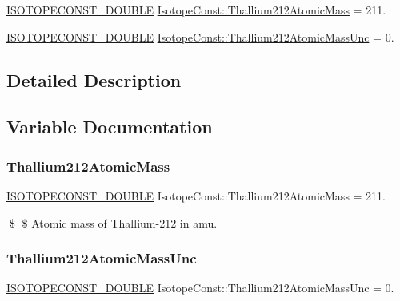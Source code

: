 \begin{DoxyCompactItemize}
\item 
\mbox{\hyperlink{group___isotope_const-_macros_ga8f45a7272ce02c0b4c65c44636ed719a}{I\+S\+O\+T\+O\+P\+E\+C\+O\+N\+S\+T\+\_\+\+D\+O\+U\+B\+LE}} \mbox{\hyperlink{group___isotope_const-_thallium-_tl212_gaec1659a9faf24b40a7d51c0818119d07}{Isotope\+Const\+::\+Thallium212\+Atomic\+Mass}} = 211.
\item 
\mbox{\hyperlink{group___isotope_const-_macros_ga8f45a7272ce02c0b4c65c44636ed719a}{I\+S\+O\+T\+O\+P\+E\+C\+O\+N\+S\+T\+\_\+\+D\+O\+U\+B\+LE}} \mbox{\hyperlink{group___isotope_const-_thallium-_tl212_ga26e8e768a3ff1b3d523568523ae81fc6}{Isotope\+Const\+::\+Thallium212\+Atomic\+Mass\+Unc}} = 0.
\end{DoxyCompactItemize}


\subsection{Detailed Description}


\subsection{Variable Documentation}
\mbox{\label{group___isotope_const-_thallium-_tl212_gaec1659a9faf24b40a7d51c0818119d07}} 
\subsubsection{\texorpdfstring{Thallium212\+Atomic\+Mass}{Thallium212AtomicMass}}
{\footnotesize\ttfamily \mbox{\hyperlink{group___isotope_const-_macros_ga8f45a7272ce02c0b4c65c44636ed719a}{I\+S\+O\+T\+O\+P\+E\+C\+O\+N\+S\+T\+\_\+\+D\+O\+U\+B\+LE}} Isotope\+Const\+::\+Thallium212\+Atomic\+Mass = 211.}

\$ \$ Atomic mass of Thallium-\/212 in amu. \mbox{\label{group___isotope_const-_thallium-_tl212_ga26e8e768a3ff1b3d523568523ae81fc6}} 
\subsubsection{\texorpdfstring{Thallium212\+Atomic\+Mass\+Unc}{Thallium212AtomicMassUnc}}
{\footnotesize\ttfamily \mbox{\hyperlink{group___isotope_const-_macros_ga8f45a7272ce02c0b4c65c44636ed719a}{I\+S\+O\+T\+O\+P\+E\+C\+O\+N\+S\+T\+\_\+\+D\+O\+U\+B\+LE}} Isotope\+Const\+::\+Thallium212\+Atomic\+Mass\+Unc = 0.}

